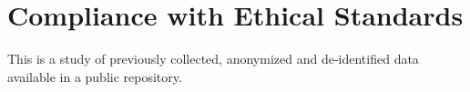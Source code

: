 \section{Compliance with Ethical Standards}
This is a study of previously collected, anonymized and de-identified data available in a public repository.